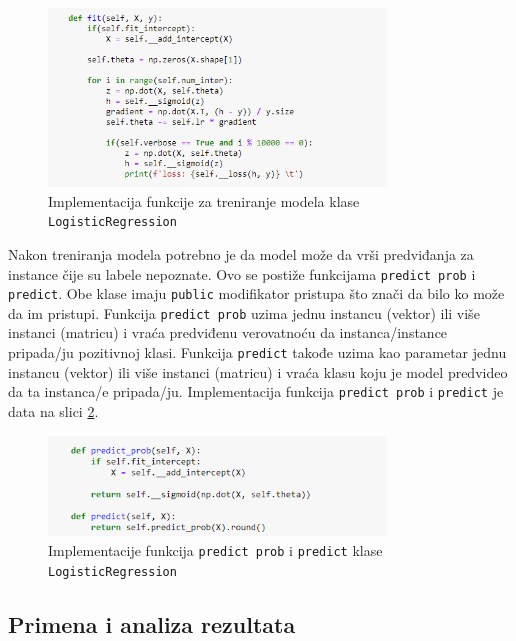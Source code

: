 \documentclass[a4paper,12pt]{report}
\begin{document}
\begin{figure}[h]
    \centering
    \includegraphics[width=0.8\textwidth]{logistic_fit.png}
    \caption{Implementacija funkcije za treniranje modela klase \texttt{LogisticRegression}}\label{fig:logfit}
\end{figure}

Nakon treniranja modela potrebno je da model može da vrši predviđanja za instance čije su labele nepoznate. Ovo se postiže funkcijama \texttt{predict prob} i \texttt{predict}. Obe klase imaju \texttt{public} modifikator pristupa što znači da bilo ko može da im pristupi. Funkcija \texttt{predict prob} uzima jednu instancu (vektor) ili više instanci (matricu)  i vraća predviđenu verovatnoću da instanca/instance pripada/ju pozitivnoj klasi. Funkcija \texttt{predict} takođe uzima kao parametar jednu instancu (vektor) ili više instanci (matricu) i vraća klasu koju je model predvideo da ta instanca/e pripada/ju.  Implementacija funkcija \texttt{predict prob} i \texttt{predict} je data na slici \ref{fig:logpred}.

\begin{figure}[h]
    \centering
    \includegraphics[width=0.8\textwidth]{logistic_predict.png}
    \caption{Implementacije funkcija \texttt{predict prob} i \texttt{predict} klase \texttt{LogisticRegression}}\label{fig:logpred}
\end{figure}

\subsection{Primena i analiza rezultata}
 \label{chap:primenalogistic}
 
\end{document}
